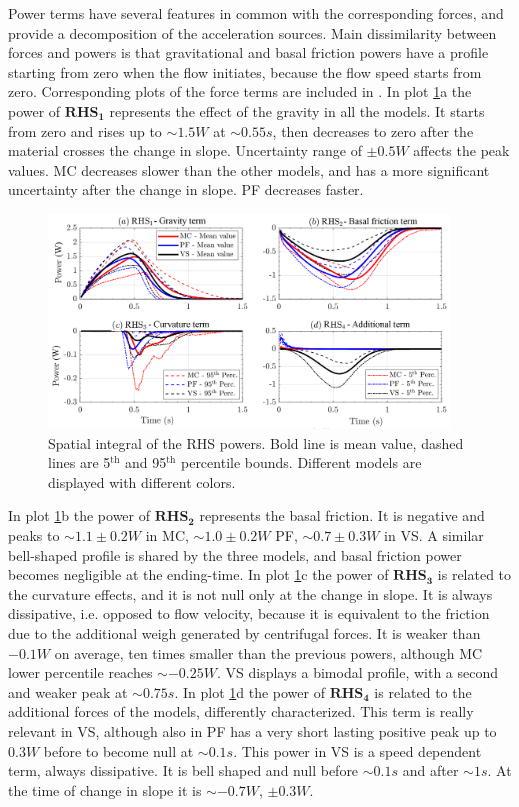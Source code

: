 \documentclass{article}
\begin{document}
Power terms have several features in common with the corresponding forces, and provide a decomposition of the acceleration sources. Main dissimilarity between forces and powers is that gravitational and basal friction powers have a profile starting from zero when the flow initiates, because the flow speed starts from zero. Corresponding plots of the force terms are included in \cite{Patra2018}. In plot \ref{fig:Ramp-Power-spatial}a the power of $\boldsymbol{RHS_1}$ represents the effect of the gravity in all the models. It starts from zero and rises up to $\sim 1.5 W$ at $\sim 0.55 s$, then decreases to zero after the material crosses the change in slope. Uncertainty range of $\pm 0.5 W$ affects the peak values. MC decreases slower than the other models, and has a more significant uncertainty after the change in slope. PF decreases faster.
\begin{figure}[H]
        \centering
        \includegraphics[width=0.95\textwidth]{figures/incline/PowersIncline.png}
        \caption{Spatial integral of the RHS powers. Bold line is mean value, dashed lines are 5$^{\mathrm{th}}$ and 95$^{\mathrm{th}}$ percentile bounds. Different models are displayed with different colors.}
        \label{fig:Ramp-Power-spatial}
\end{figure}
In plot \ref{fig:Ramp-Power-spatial}b the power of  $\boldsymbol{RHS_2}$ represents the basal friction. It is negative and peaks to $\sim 1.1 \pm 0.2 W$ in MC, $\sim 1.0 \pm 0.2 W$ PF, $\sim 0.7 \pm 0.3 W$ in VS. A similar bell-shaped profile is shared by the three models, and basal friction power becomes negligible at the ending-time. In plot \ref{fig:Ramp-Power-spatial}c the power of $\boldsymbol{RHS_3}$ is related to the curvature effects, and it is not null only at the change in slope. It is always dissipative, i.e. opposed to flow velocity, because it is equivalent to the friction due to the additional weigh generated by centrifugal forces. It is weaker than $-0.1 W$ on average, ten times smaller than the previous powers, although MC lower percentile reaches $\sim -0.25 W$. VS displays a bimodal profile, with a second and weaker peak at $\sim 0.75 s$. In plot \ref{fig:Ramp-Power-spatial}d the power of $\boldsymbol{RHS_4}$ is related to the additional forces of the models, differently characterized. This term is really relevant in VS, although also in PF has a very short lasting positive peak up to $0.3 W$ before to become null at $\sim 0.1 s$. This power in VS is a speed dependent term, always dissipative. It is bell shaped and null before $\sim 0.1 s$ and after $\sim 1 s$. At the time of change in slope it is $\sim -0.7 W$, $\pm 0.3 W$.
\end{document}
